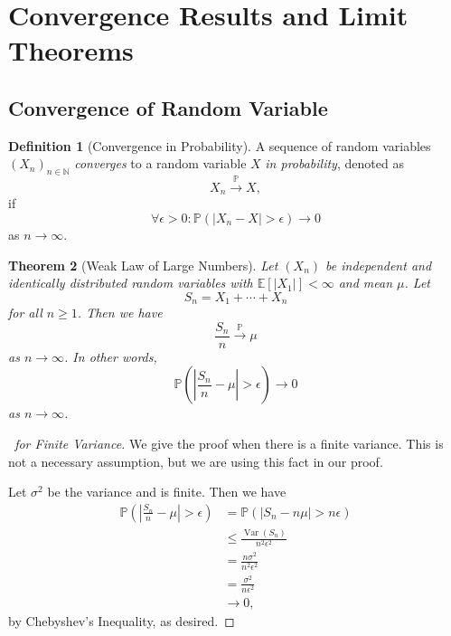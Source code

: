 \documentclass[11pt]{article}
\numberwithin{equation}{section}
\newtheorem{theorem}{Theorem}[section]
\theoremstyle{definition}
\newtheorem{definition}[theorem]{Definition}
\theoremstyle{remark}
\newcommand{\pqty}[1]{\left(#1\right)}
\newcommand{\abs}[1]{\left|#1\right|}
\newcommand{\NN}{\mathbb N}
\newcommand{\Prob}{\mathbb P}
\newcommand{\Expt}{\mathbb E}
\DeclareMathOperator{\Var}{Var}
\newcommand{\toProb}{\xrightarrow{\mathbb P}}
\begin{document}
\section{Convergence Results and Limit Theorems}\label{probability-section-14}

\subsection{Convergence of Random Variable}

\begin{definition}[Convergence in Probability]\label{probability-definition-068}
    \label{probability-def:convergence-in-probability}%
    A sequence of random variables \(\pqty{X_n}_{n \in \NN}\) \emph{converges} to a random variable \(X\) \emph{in probability}, denoted as
    \[
        X_n \toProb X,
    \]
    if
    \[
        \forall \epsilon > 0: \Prob\pqty{\abs{X_n - X} > \epsilon} \to 0
    \]
    as \(n \to \infty\).
\end{definition}

\begin{theorem}[Weak Law of Large Numbers]\label{probability-theorem-025}
    \label{probability-thm:weak-law-of-large-numbers}%
    Let \(\pqty{X_n}\) be independent and identically distributed random variables with \(\Expt[|X_1|]<\infty\) and mean \(\mu\). Let
    \[
        S_n = X_1 + \cdots + X_n
    \]
    for all \(n \geq 1\). Then we have
    \[
        \frac{S_n}{n} \toProb \mu
    \]
    as \(n \to \infty\). In other words,
    \[
        \Prob\pqty{\abs{\frac{S_n}{n} - \mu} > \epsilon} \to 0
    \]
    as \(n \to \infty\).
\end{theorem}

\begin{proof}[\proofname\ for Finite Variance]\label{probability-proof-088}
    We give the proof when there is a finite variance. This is not a necessary assumption, but we are using this fact in our proof.

    Let \(\sigma^2\) be the variance and is finite. Then we have
    \begin{align*}
        \Prob\pqty{\abs{\frac{S_n}{n} - \mu} > \epsilon} &= \Prob\pqty{\abs{S_n - n \mu} > n \epsilon} \\
        &\leq \frac{\Var\pqty{S_n}}{n^2 \epsilon^2} \\
        &= \frac{n \sigma^2}{n^2 \epsilon^2} \\
        &= \frac{\sigma^2}{n \epsilon^2} \\
        &\to 0,
    \end{align*}
    by Chebyshev's Inequality, as desired.
\end{proof}
\end{document}
